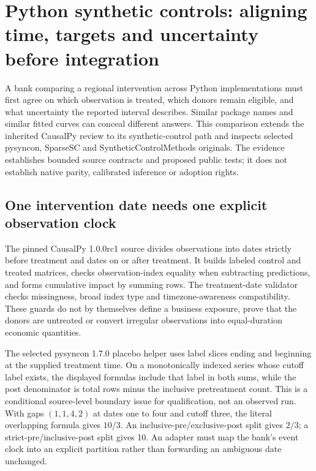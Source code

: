 \section{Python synthetic controls: aligning time, targets and uncertainty before integration}
\label{sec:exec25-synthetic-python-coverage}

A bank comparing a regional intervention across Python implementations must
first agree on which observation is treated, which donors remain eligible,
and what uncertainty the reported interval describes. Similar package names
and similar fitted curves can conceal different answers. This comparison
extends the inherited CausalPy review to its synthetic-control path and
inspects selected pysyncon, SparseSC and SyntheticControlMethods originals.
The evidence establishes bounded source contracts and proposed public tests;
it does not establish native parity, calibrated inference or adoption rights.
\citep{exec25_synthpy_choice}

\subsection{One intervention date needs one explicit observation clock}
The pinned CausalPy 1.0.0rc1 source divides observations into dates strictly
before treatment and dates on or after treatment. It builds labeled control
and treated matrices, checks observation-index equality when subtracting
predictions, and forms cumulative impact by summing rows. The treatment-date
validator checks missingness, broad index type and timezone-awareness
compatibility. These guards do not by themselves define a business exposure,
prove that the donors are untreated or convert irregular observations into
equal-duration economic quantities.~\citep{exec25_synthpy_causalpy}

The selected pysyncon 1.7.0 placebo helper uses label slices ending and
beginning at the supplied treatment time. On a monotonically indexed series
whose cutoff label exists, the displayed formulas include that label in both
sums, while the post denominator is total rows minus the inclusive
pretreatment count. This is a conditional source-level boundary issue for
qualification, not an observed run. With gaps $(1,1,4,2)$ at dates one to
four and cutoff three, the literal overlapping formula gives $10/3$.
An inclusive-pre/exclusive-post split gives $2/3$; a strict-pre/inclusive-post
split gives 10. An adapter must map the bank's event clock into an explicit
partition rather than forwarding an ambiguous date unchanged.
\citep{exec25_synthpy_pysyncon,exec25_synthpy_choice}

